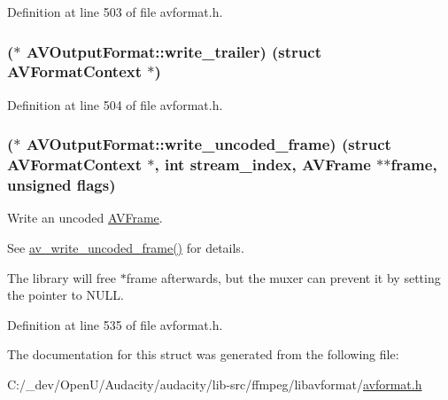 Definition at line 503 of file avformat.\+h.

\subsubsection[{\texorpdfstring{write\+\_\+trailer}{write_trailer}}]{($\ast$ A\+V\+Output\+Format\+::write\+\_\+trailer) (struct {\bf A\+V\+Format\+Context} $\ast$)}\hypertarget{struct_a_v_output_format_abf35da5f2d210523507001ca0fa26a48}{}\label{struct_a_v_output_format_abf35da5f2d210523507001ca0fa26a48}


Definition at line 504 of file avformat.\+h.

\subsubsection[{\texorpdfstring{write\+\_\+uncoded\+\_\+frame}{write_uncoded_frame}}]{($\ast$ A\+V\+Output\+Format\+::write\+\_\+uncoded\+\_\+frame) (struct {\bf A\+V\+Format\+Context} $\ast$, {\bf int} stream\+\_\+index, {\bf A\+V\+Frame} $\ast$$\ast$frame, unsigned {\bf flags})}\hypertarget{struct_a_v_output_format_a6c35fd05fb664e4950de2173bbeda793}{}\label{struct_a_v_output_format_a6c35fd05fb664e4950de2173bbeda793}
Write an uncoded \hyperlink{struct_a_v_frame}{A\+V\+Frame}.

See \hyperlink{group__lavf__encoding_gaab766dccdff1bf323a2fc604e723b441}{av\+\_\+write\+\_\+uncoded\+\_\+frame()} for details.

The library will free $\ast$frame afterwards, but the muxer can prevent it by setting the pointer to N\+U\+LL. 

Definition at line 535 of file avformat.\+h.



The documentation for this struct was generated from the following file\+:\begin{DoxyCompactItemize}
\item 
C\+:/\+\_\+dev/\+Open\+U/\+Audacity/audacity/lib-\/src/ffmpeg/libavformat/\hyperlink{avformat_8h}{avformat.\+h}\end{DoxyCompactItemize}
